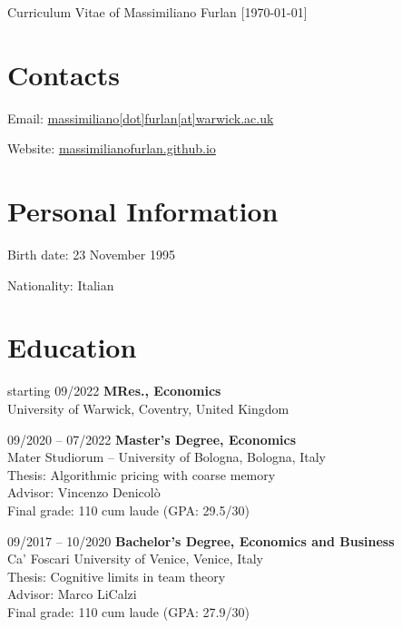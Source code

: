 \documentclass[11pt,a4paper]{article}
\begin{document}
\date{}
\thispagestyle{empty}
\setlength\cvlabelwidth{90pt}

\begin{cv}{\huge Curriculum Vitae of Massimiliano Furlan \normalsize{[\today]}} %

\section{Contacts}

\begin{cvlist}{}
	\itemsep -4pt
	\item[Email:] \href{mailto:massimiliano[dot]furlan[at]warwick.ac.uk}{massimiliano[dot]furlan[at]warwick.ac.uk}
	\item[Website:] \href{https://massimilianofurlan.github.io}{massimilianofurlan.github.io}
\end{cvlist}
\vspace{-20pt}

\section{Personal Information}

\begin{cvlist}{}
	\itemsep -4pt
	\item[Birth date:] 23 November 1995
	\item[Nationality:] Italian
\end{cvlist}
\vspace{-20pt}

\section{Education}

\begin{cvlist}{}
	\item[starting 09/2022] 
		\textbf{MRes., Economics}\\ 
		University of Warwick, Coventry, United Kingdom
	\item[09/2020 -- 07/2022] 
		\textbf{Master's Degree, Economics}\\ 
		 Mater Studiorum -- University of Bologna, Bologna, Italy\\
		Thesis: Algorithmic pricing with coarse memory\\
		Advisor: Vincenzo Denicolò\\
		Final grade: 110 cum laude \quad (GPA: 29.5/30)
	\item[09/2017 -- 10/2020] 
		\textbf{Bachelor's Degree, Economics and Business}\\
		Ca' Foscari University of Venice, Venice, Italy\\
		Thesis: Cognitive limits in team theory\\
		Advisor: Marco LiCalzi\\
		Final grade: 110 cum laude \quad (GPA: 27.9/30)	
\end{cvlist}
\vspace{-20pt}


\end{cv}
\end{document}
